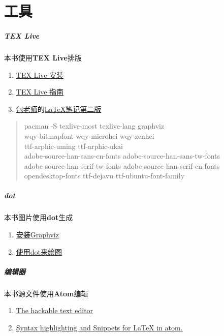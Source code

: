\chapter{工具}

\paragraph{TEX Live}
本书使用\textbf{TEX Live}排版
\begin{enumerate}
  \item \href{https://wiki.archlinux.org/index.php/TeX_Live_(%E7%AE%80%E4%BD%93%E4%B8%AD%E6%96%87)}{TEX Live 安装}
  \item \href{https://www.tug.org/texlive/doc/texlive-zh-cn/texlive-zh-cn.pdf}{TEX Live 指南}
  \item \href{http://www.dralpha.com/zh/index.htm}{包老师}的\href{http://dralpha.altervista.org/zh/tech/lnotes2.pdf}{LaTeX笔记第二版}
\end{enumerate}

\begin{quote}
  pacman -S texlive-most texlive-lang graphviz \\
  wqy-bitmapfont wqy-microhei wqy-zenhei \\
  ttf-arphic-uming ttf-arphic-ukai \\
  adobe-source-han-sans-cn-fonts adobe-source-han-sans-tw-fonts \\
  adobe-source-han-serif-tw-fonts adobe-source-han-serif-cn-fonts \\
  opendesktop-fonts ttf-dejavu ttf-ubuntu-font-family
\end{quote}


\paragraph{dot}
本书图片使用\textbf{dot}生成
\begin{enumerate}
  \item \href{https://wiki.archlinux.org/index.php/Graphviz}{安装Graphviz}
  \item \href{http://www.jianshu.com/p/5b02445eca1d}{使用dot来绘图}
\end{enumerate}

\paragraph{编辑器}
本书源文件使用\textbf{Atom}编辑
\begin{enumerate}
  \item \href{https://github.com/atom/atom}{The hackable text editor}
  \item \href{https://atom.io/packages/language-latex}{Syntax highlighting and Snippets for LaTeX in atom.}
\end{enumerate}

